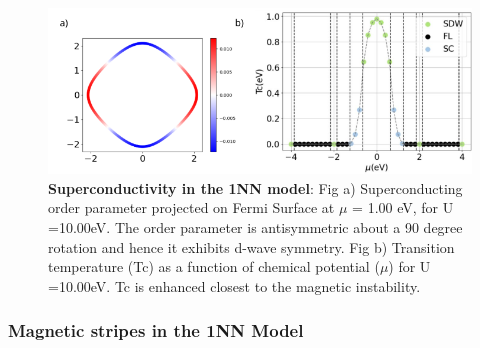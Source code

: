 \documentclass[12pt]{article}
\begin{document}
\begin{figure}[htbp]  %
    \centering
    \includegraphics[width=1.0\textwidth]{1NNSC.png}  %
    \caption{\textbf{Superconductivity in the 1NN model}:  
    Fig a) Superconducting order parameter projected on Fermi Surface at $\mu$ = 1.00 eV, 
    for U =10.00eV. The order parameter is antisymmetric about a 90 degree rotation and hence
    it exhibits d-wave symmetry. 
    Fig b) Transition temperature (Tc) as a function of chemical potential ($\mu$) for U =10.00eV.
    Tc is enhanced closest to the magnetic instability.   
    }
    \label{fig:1NNSC}
\end{figure}



\subsubsection{Magnetic stripes in the 1NN Model}
\end{document}

